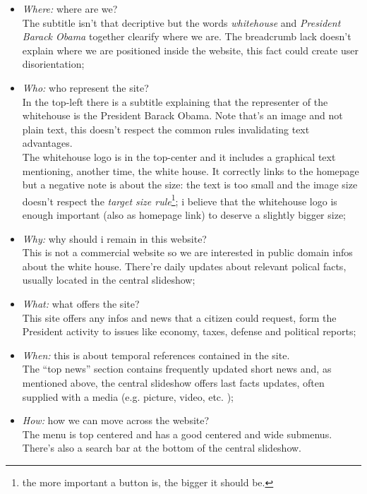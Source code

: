 \documentclass[
10pt, %
a4paper, %
oneside, %
headinclude,footinclude, %
BCOR5mm, %
]{scrartcl}
\begin{document}
\begin{itemize}%
	\item \textit{Where:} where are we? \\ The subtitle isn't that decriptive but the words \emph{whitehouse} and \emph{President Barack Obama} together clearify where we are. The breadcrumb lack doesn't explain where we are positioned inside the website, this fact could create user disorientation;

	\item \textit{Who:} who represent the site? \\ In the top-left there is a subtitle explaining that the representer of the whitehouse is the President Barack Obama. Note that's an image and not plain text, this doesn't respect the common rules invalidating text advantages. \\
	The whitehouse logo is in the top-center and it includes a graphical text mentioning, another time, the white house. It correctly links to the homepage but a negative note is about the size: the text is too small and the image size doesn't respect the \emph{target size rule}\footnote{the more important a button is, the bigger it should be.}; i believe that the whitehouse logo is enough important (also as homepage link) to deserve a slightly bigger size;

	\item \textit{Why:} why should i remain in this website? \\ This is not a commercial website so we are interested in public domain infos about the white house. There're daily updates about relevant polical facts, usually located in the central slideshow;

	\item \textit{What:} what offers the site? \\ This site offers any infos and news that a citizen could request, form the President activity to issues like economy, taxes, defense and political reports;

	\item \textit{When:} this is about temporal references contained in the site. \\ The ``top news'' section contains frequently updated short news and, as mentioned above, the central slideshow offers last facts updates, often supplied with a media (e.g. picture, video, etc. ); 

	\item \textit{How:} how we can move across the website? \\ The menu is top centered and has a good centered and wide submenus. There's also a search bar at the bottom of the central slideshow.

\end{itemize}
\end{document}
